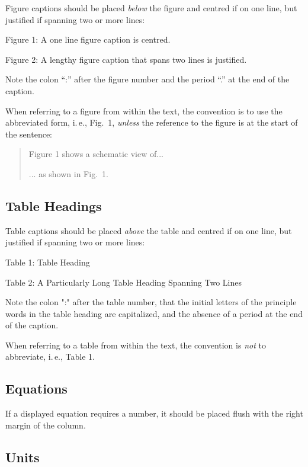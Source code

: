 Figure captions should be placed \emph{below} the figure and
centred if on one line, but justified if spanning two or
more lines:
\begin{center}
	Figure 1: A one line figure caption is centred.
\end{center}
\begin{justify}
	Figure 2: A lengthy figure caption that spans
	two lines is justified.
\end{justify}
Note the colon “:” after the figure number and the period
“.” at the end of the caption.


When referring to a figure from within the text, the
convention is to use the abbreviated form, i.\,e., Fig.~1,
\emph{unless} the reference to the figure is at the start of the sentence:
\begin{quote}
	Figure 1 shows a schematic view of...
	
	... as shown in Fig.~1.
\end{quote}

\subsection{Table Headings}

Table captions should be placed \emph{above} the table and
centred if on one line, but justified if spanning two or
more lines:
\begin{center}
	Table 1: Table Heading
\end{center}
\begin{justify}
	Table 2: A Particularly Long Table Heading
	Spanning Two Lines
\end{justify}

Note the colon ":" after the table number, that the initial
letters of the principle words in the table heading are
capitalized, and the absence of a period at the end of the
caption.

When referring to a table from within the text, the convention
is \emph{not} to abbreviate, i.\,e., Table 1.

\subsection{Equations}

If a displayed equation requires a number, it should be
placed flush with the right margin of the column. 

\subsection{Units}


